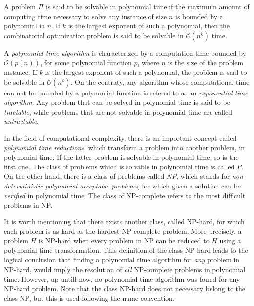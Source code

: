 A problem $\Pi$ is said to be solvable in polynomial time if the maximum amount of computing time necessary to solve any instance of size $n$ 
is bounded by a polynomial in $n$. If $k$ is the largest exponent of such a polynomial,
then the combinatorial optimization problem is said to be solvable in $\mathcal{O}(n^k)$ time.

A \textit{polynomial time algorithm} is characterized by a computation time bounded by $\mathcal{O}(p(n))$, for some polynomial function $p$, 
where $n$ is the size of the problem instance. If $k$ is the largest exponent of such a polynomial, 
the problem is said to be solvable in $\mathcal{O}(n^k)$. On the contraty, 
any algorithm whose computational time can not be bounded by a polynomial function is refered to as an \textit{exponential time algorithm}.
Any problem that can be solved in polynomial time is said to be \textit{tractable}, while problems that 
are not solvable in polynomial time are called \textit{untractable}.

In the field of computational complexity, there is an important concept called \textit{polynomial time reductions},
which transform a problem into another problem, in polynomial time. If the latter problem 
is solvable in polynomial time, so is the first one. The class of problems which is solvable in polynomial time is called $P$.
On the other hand, there is a class of problems called $NP$, which stands for \textit{non-deterministic polynomial acceptable problems},
for which given a solution can be \textit{verified} in polynomial time.    
The class of NP-complete refers to the most difficult problems in NP.

It is worth mentioning that there exists another class, called NP-hard, for which each problem is as hard as the hardest NP-complete problem.
More precisely, a problem $H$ is NP-hard when every problem in NP can be reduced to $H$ using a polynomial time transformation.
This definition of the class NP-hard leads to the logical conclusion that finding a polynomial time algorithm for \textit{any} problem in NP-hard,
would imply the resolution of \textit{all} NP-complete problems in polynomial time. However, up untill now, no polynomial time algorithm was found for any NP-hard problem.
Note that the class NP-hard does not necessary belong to the class NP, but this is used following the name convention.


